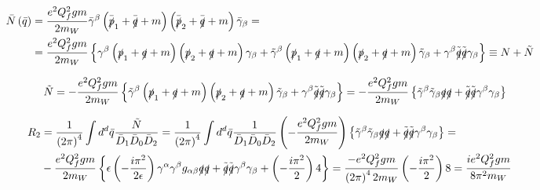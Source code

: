 \begin{align*}
\bar{N} \left( \bar{q} \right) & = \frac{e^2Q_f^2gm}{2m_W} \bar{\gamma}^{\beta} \left( \bar{\slashed{p}}_1 + \bar{\slashed{q}} + m \right) \left( \bar{\slashed{p}}_2 + \bar{\slashed{q}} + m \right) \bar{\gamma}_{\beta} = & \\
& = \frac{e^2Q_f^2gm}{2m_W} \left\lbrace \gamma^{\beta} \left( \slashed{p}_1 + \slashed{q} + m \right) \left( \slashed{p}_2 + \slashed{q} + m \right) \gamma_{\beta} + \tilde{\gamma}^{\beta} \left( \slashed{p}_1 + \slashed{q} + m \right) \left( \slashed{p}_2 + \slashed{q} + m \right) \tilde{\gamma}_{\beta} + \gamma^{\beta} \tilde{\slashed{q}} \tilde{\slashed{q}} \gamma_{\beta} \right\rbrace \equiv N + \tilde{N} &
\end{align*}

\begin{equation*}
\tilde{N} = -\frac{e^2Q_f^2gm}{2m_W} \left\lbrace \tilde{\gamma}^{\beta} \left( \slashed{p}_1 + \slashed{q} + m \right) \left( \slashed{p}_2 + \slashed{q} + m \right) \tilde{\gamma}_{\beta} + \gamma^{\beta} \tilde{\slashed{q}} \tilde{\slashed{q}} \gamma_{\beta} \right\rbrace = -\frac{e^2Q_f^2gm}{2m_W} \left\lbrace \tilde{\gamma}^{\beta}\tilde{\gamma}_{\beta} \slashed{q}\slashed{q} + \tilde{\slashed{q}} \tilde{\slashed{q}} \gamma^{\beta}\gamma_{\beta} \right\rbrace 
\end{equation*}

\begin{align*}
R_2 & = \frac{1}{\left( 2\pi \right)^4} \int d^d \bar{q} \frac{\tilde{N}}{\bar{D}_1\bar{D}_0\bar{D}_2} = \frac{1}{\left( 2\pi \right)^4} \int d^d \bar{q} \frac{1}{\bar{D}_1\bar{D}_0\bar{D}_2} \left(-\frac{e^2Q_f^2gm}{2m_W} \right) \left\lbrace \tilde{\gamma}^{\beta}\tilde{\gamma}_{\beta} \slashed{q}\slashed{q} + \tilde{\slashed{q}} \tilde{\slashed{q}} \gamma^{\beta}\gamma_{\beta} \right\rbrace  = & \\
& -\frac{e^2Q_f^2gm}{2m_W} \left\lbrace \epsilon \left( -\frac{i\pi^2}{2\epsilon} \right) \gamma^{\alpha} \gamma^{\beta} g_{\alpha\beta} \slashed{q}\slashed{q} + \tilde{\slashed{q}} \tilde{\slashed{q}} \gamma^{\beta}\gamma_{\beta} + \left( - \frac{i\pi^2}{2} \right) 4 \right\rbrace = \frac{-e^2Q_f^2gm}{\left( 2\pi \right)^4 2m_W} \left( - \frac{i\pi^2}{2} \right) 8 = \frac{ie^2Q_f^2gm}{8\pi^2m_W} &
\end{align*}